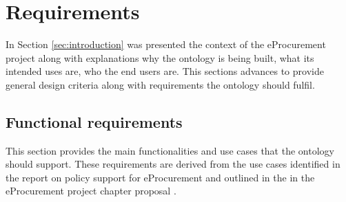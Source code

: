 \section{Requirements}
\label{sec:requirements}
	
	In Section \ref{sec:introduction} was presented the context of the eProcurement project along with explanations why the ontology is being built, what its intended uses are, who the end	users are. This sections advances to provide general design criteria along with requirements the ontology should fulfil.
	
	\subsection{Functional requirements}
	\label{sec:functional-requirements}	
	
	This section provides the main functionalities and use cases that the ontology should support. These requirements are derived from the use cases identified in the report on policy support for eProcurement \cite{d4.07-2016} and outlined in the in the eProcurement project chapter proposal \cite{d2.02-2017}.
	
